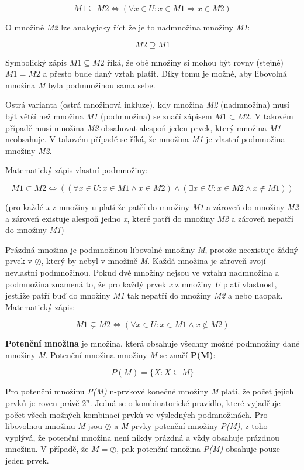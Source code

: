$$ M1 \subseteq M2 \Leftrightarrow (\forall x \in U: x \in M1 \Rightarrow x \in M2) $$

O množině {\it M2} lze analogicky říct že je to nadmnožina množiny {\it M1}:

$$ M2 \supseteq M1 $$

Symbolický zápis $M1 \subseteq M2$ říká, že obě množiny si mohou být rovny (stejné) $M1 = M2$ a přesto bude daný vztah platit. Díky tomu je možné, aby libovolná množina {\it M} byla podmnožinou sama sebe.

Ostrá varianta (ostrá množinová inkluze), kdy množina {\it M2} (nadmnožina) musí být větší než množina {\it M1} (podmnožina) se značí zápisem $M1 \subset M2$. V takovém případě musí množina {\it M2} obsahovat alespoň jeden prvek, který množina {\it M1} neobsahuje. V takovém případě se říká, že množina {\it M1} je vlastní podmnožina množiny {\it M2}. 

Matematický zápis vlastní podmnožiny:

$$ M1 \subset M2 \Leftrightarrow ((\forall x \in U: x \in M1 \wedge x \in M2) \wedge (\exists x \in U: x \in M2 \wedge x \notin M1)) $$


(pro každé {\it x} z množiny u platí že patří do množiny {\it M1} a zároveň do množiny {\it M2} a zároveň existuje alespoň jedno {\it x}, které patří do množiny {\it M2} a zároveň nepatří do množiny {\it M1})


\vskip 4mm
\centerline{}
\vskip 4mm



Prázdná množina je podmnožinou libovolné množiny {\it M}, protože neexistuje žádný prvek v $\oslash$, který by nebyl v množině {\it M}. Každá množina je zároveň svojí nevlastní podmnožinou. Pokud dvě množiny nejsou ve vztahu nadmnožina a podmnožina znamená to, že pro každý prvek {\it x} z množiny {\it U} platí vlastnost, jestliže patří buď do množiny {\it M1} tak nepatří do množiny {\it M2} a nebo naopak. Matematický zápis:

$$ M1 \subsetneq M2 \Leftrightarrow  (\forall x \in U: x \in M1 \wedge x \notin M2) $$


{\bf Potenční množina} je množina, která obsahuje všechny možné podmnožiny dané množiny {\it M}. Potenční množina množiny {\it M} se značí {\bf P(M)}:

$$P(M) = \{ X : X \subseteq M  \} $$ 

Pro potenční množinu {\it P(M)} n-prvkové konečné množiny {\it M} platí, že počet jejich prvků je roven právě $2^n$. Jedná se o kombinatorické pravidlo, které vyjadřuje počet všech možných kombinací prvků ve výsledných podmnožinách. Pro libovolnou množinu {\it M} jsou $\oslash$ a {\it M} prvky potenční množiny {\it P(M)}, z toho vyplývá, že potenční množina není nikdy prázdná a vždy obsahuje prázdnou množinu. V případě, že $M = \oslash$, pak potenční množina {\it P(M)} obsahuje pouze jeden prvek. 

